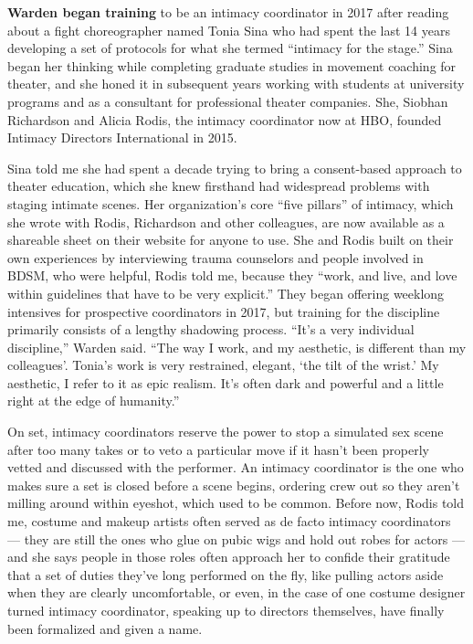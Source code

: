 \textbf{Warden began training} to be an intimacy coordinator in 2017
after reading about a fight choreographer named Tonia Sina who had spent
the last 14 years developing a set of protocols for what she termed
``intimacy for the stage.'' Sina began her thinking while completing
graduate studies in movement coaching for theater, and she honed it in
subsequent years working with students at university programs and as a
consultant for professional theater companies. She, Siobhan Richardson
and Alicia Rodis, the inti­macy coordinator now at HBO, founded Intimacy
Directors International in 2015.

Sina told me she had spent a decade trying to bring a consent-based
approach to theater education, which she knew firsthand had widespread
problems with staging intimate scenes. Her organization's core ``five
pillars'' of intimacy, which she wrote with Rodis, Richardson and other
colleagues, are now available as a shareable sheet on their website for
anyone to use. She and Rodis built on their own experiences by
interviewing trauma counselors and people involved in BDSM, who were
helpful, Rodis told me, because they ``work, and live, and love within
guidelines that have to be very explicit.'' They began offering weeklong
intensives for prospective coordinators in 2017, but training for the
discipline primarily consists of a lengthy shadowing process. ``It's a
very individual discipline,'' Warden said. ``The way I work, and my
aesthetic, is different than my colleagues'. Tonia's work is very
restrained, elegant, `the tilt of the wrist.' My aesthetic, I refer to
it as epic realism. It's often dark and powerful and a little right at
the edge of humanity.''

On set, intimacy coordinators reserve the power to stop a simulated sex
scene after too many takes or to veto a particular move if it hasn't
been properly vetted and discussed with the performer. An intimacy
coordinator is the one who makes sure a set is closed before a scene
begins, ordering crew out so they aren't milling around within eyeshot,
which used to be common. Before now, Rodis told me, costume and makeup
artists often served as de facto intimacy coordinators --- they are
still the ones who glue on pubic wigs and hold out robes for actors ---
and she says people in those roles often approach her to confide their
gratitude that a set of duties they've long performed on the fly, like
pulling actors aside when they are clearly uncomfortable, or even, in
the case of one costume designer turned intimacy coordinator, speaking
up to directors themselves, have finally been formalized and given a
name.

